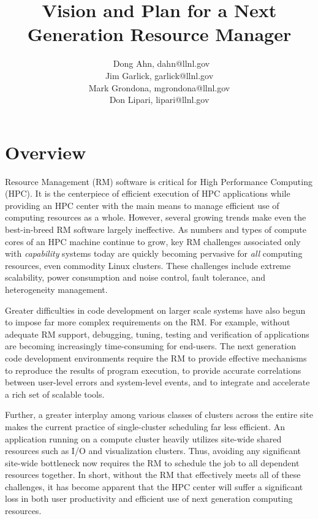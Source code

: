 \documentclass{article}
\newcommand{\ngrmfull}{Next Generation Resource Manager}
\begin{document}
\title{Vision and Plan for a \ngrmfull}
\author{\
Dong Ahn, dahn@llnl.gov\\
Jim Garlick, garlick@llnl.gov\\
Mark Grondona, mgrondona@llnl.gov\\
Don Lipari, lipari@llnl.gov}


\maketitle

\section{Overview}
\label{sect:overview}
Resource Management (RM) software is critical for High Performance Computing
(HPC). It is the centerpiece of efficient execution of HPC applications
while providing an HPC center with the main means to manage efficient use
of computing resources as a whole.  However, several growing trends make
even the best-in-breed RM software largely ineffective.  As numbers and
types of compute cores of an HPC machine continue to grow, key RM challenges
associated only with {\em capability} systems today are quickly
becoming pervasive for {\em all} computing resources, even commodity
Linux clusters.  These challenges include extreme scalability, power
consumption and noise control, fault tolerance, and heterogeneity management.

Greater difficulties in code development on larger scale systems have
also begun to impose far more complex requirements on the RM.  For example,
without adequate RM support, debugging, tuning, testing and verification
of applications are becoming increasingly time-consuming for end-users.
The next generation code development environments require the RM to provide
effective mechanisms to reproduce the results of program execution, to
provide accurate correlations between user-level errors and system-level
events, and to integrate and accelerate a rich set of scalable tools.

Further, a greater interplay among various classes of clusters across
the entire site makes the current practice of single-cluster scheduling
far less efficient.  An application running on a compute cluster heavily
utilizes site-wide shared resources such as I/O and visualization clusters.
Thus, avoiding any significant site-wide bottleneck now requires the RM
to schedule the job to all dependent resources together. In short, without
the RM that effectively meets all of these challenges, it has become apparent
that the HPC center will suffer a significant loss in both user productivity
and efficient use of next generation computing resources.
\end{document}
